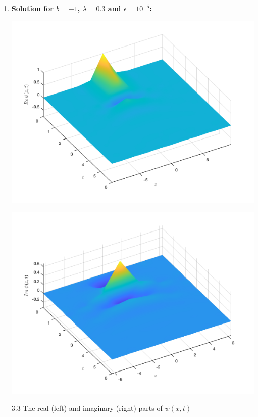 \documentclass[12pt, letterpaper, twoside]{article}
\begin{document}
\begin{enumerate}[label=(\roman*)]
    \item \textbf{Solution for $b=-1$, $\lambda=0.3$ and $\epsilon=10^{-5}$:}
    \begin{multicols}{2}
        \begin{center}
            \includegraphics[scale=0.35]{with friction/(b-1real).png}
        \end{center} 
        \begin{center}
            \includegraphics[scale=0.35]{with friction/(b-1imag).png}
        \end{center}  
    \end{multicols}
    \figurename{ 3.3 The real (left) and imaginary (right) parts of $\psi(x, t)$}
    

\end{enumerate}
\end{document}
